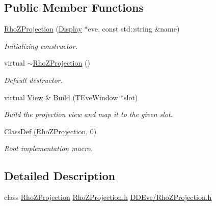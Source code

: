 \subsection*{Public Member Functions}
\begin{DoxyCompactItemize}
\item 
\hyperlink{class_d_d4hep_1_1_rho_z_projection_a53e97713415f13369aa528096a8e5a6b}{RhoZProjection} (\hyperlink{class_d_d4hep_1_1_display}{Display} $\ast$eve, const std::string \&name)
\begin{DoxyCompactList}\small\item\em Initializing constructor. \item\end{DoxyCompactList}\item 
virtual \hyperlink{class_d_d4hep_1_1_rho_z_projection_a196da05dd078d07f9f05e2a6b3eb9f3a}{$\sim$RhoZProjection} ()
\begin{DoxyCompactList}\small\item\em Default destructor. \item\end{DoxyCompactList}\item 
virtual \hyperlink{class_d_d4hep_1_1_view}{View} \& \hyperlink{class_d_d4hep_1_1_rho_z_projection_adc2e30a682bc645b5433d055774930ef}{Build} (TEveWindow $\ast$slot)
\begin{DoxyCompactList}\small\item\em Build the projection view and map it to the given slot. \item\end{DoxyCompactList}\item 
\hyperlink{class_d_d4hep_1_1_rho_z_projection_aef14a29e5037f6ac2df7eb09a8fa6c84}{ClassDef} (\hyperlink{class_d_d4hep_1_1_rho_z_projection}{RhoZProjection}, 0)
\begin{DoxyCompactList}\small\item\em Root implementation macro. \item\end{DoxyCompactList}\end{DoxyCompactItemize}


\subsection{Detailed Description}
class \hyperlink{class_d_d4hep_1_1_rho_z_projection}{RhoZProjection} \hyperlink{_rho_z_projection_8h}{RhoZProjection.h} \hyperlink{_rho_z_projection_8h}{DDEve/RhoZProjection.h} 

